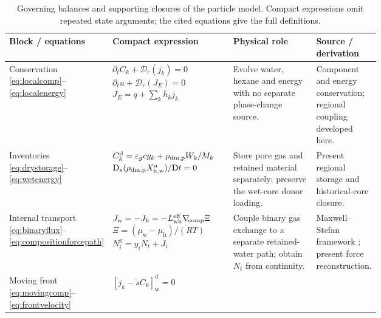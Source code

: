 \begin{table}[htbp]
\centering\small
\caption{Governing balances and supporting closures of the particle model.
Compact expressions omit repeated state arguments; the cited equations
give the full definitions.}
\label{tab:model:equations}
\setlength{\tabcolsep}{4pt}
\renewcommand{\arraystretch}{1.12}
\begin{tabular}{@{}>{\raggedright\arraybackslash}p{0.14\linewidth}
>{\raggedright\arraybackslash}p{0.33\linewidth}
>{\raggedright\arraybackslash}p{0.24\linewidth}
>{\raggedright\arraybackslash}p{}@{}}
\toprule
Block / equations & Compact expression & Physical role & Source / derivation\\
\midrule
Conservation\newline
\eqref{eq:localcomp}--\eqref{eq:localenergy}
& $\partial_t C_k+\mathcal D_r(j_k)=0$\newline
  $\partial_t u+\mathcal D_r(J_E)=0$\newline
  $J_E=q+\sum_k\bar h_kj_k$
& Evolve water, hexane and energy with no separate phase-change source.
& Component and energy conservation; regional coupling developed here.\\[5pt]
Inventories\newline
\eqref{eq:drystorage}--\eqref{eq:wetenergy}
& $C_k^{\mathrm d}=\varepsilon_gcy_k+\rho_{\mathrm{dm,p}} W_k/M_k$\newline
  $\mathrm D_s(\rho_{\mathrm{dm,p}}X_{\mathrm{h,w}}^{a})/\mathrm Dt=0$
& Store pore gas and retained material separately; preserve the wet-core donor loading.
& Present regional storage and historical-core closure.\\[5pt]
Internal transport\newline
\eqref{eq:binaryflux}--\eqref{eq:compositionforcepath}
& $J_{\mathrm w}=-J_{\mathrm h}=-L_{\mathrm{wh}}^{\mathrm{eff}}\nabla_{\!\mathrm{comp}}\Xi$\newline
  $\Xi=(\mu_{\mathrm w}-\mu_{\mathrm h})/(RT)$\newline
  $N_i^{\mathrm g}=y_iN_t+J_i$
& Couple binary gas exchange to a separate retained-water path; obtain $N_t$ from continuity.
& Maxwell--Stefan framework \citep{krishna1997maxwell}; present force reconstruction.\\[5pt]
Moving front\newline
\eqref{eq:movingcomp}--\eqref{eq:frontvelocity}
& $[j_k-\dot s C_k]_{\mathrm w}^{\mathrm d}=0$\newline

\end{tabular}
\end{table}
